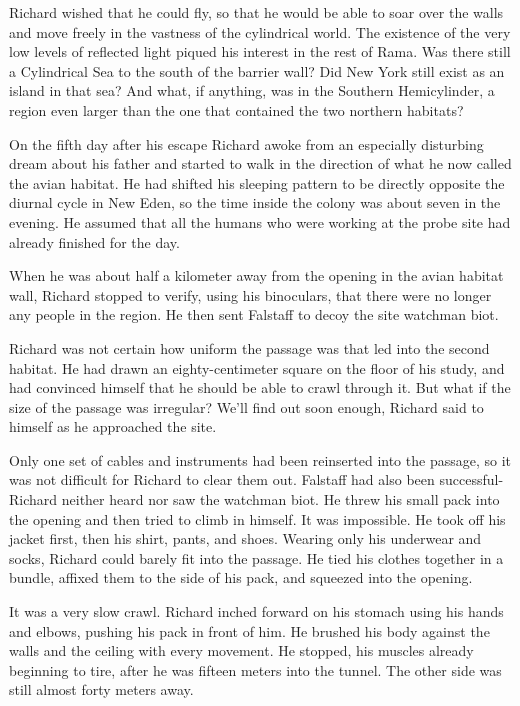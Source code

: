 \documentclass[]{article}
\begin{document}
{Richard wished that he could fly, so that he would be able to soar over the walls and move freely in the vastness of the cylindrical world.  The existence of the very low levels of reflected light piqued his interest in the rest of Rama.  Was there still a Cylindrical Sea to the south of the barrier wall? Did New York still exist as an island in that sea? And what, if anything, was in the Southern Hemicylinder, a region even larger than the one that contained the two northern habitats?

On the fifth day after his escape Richard awoke from an especially disturbing dream about his father and started to walk in the direction of what he now called the avian habitat.  He had shifted his sleeping pattern to be directly opposite the diurnal cycle in New Eden, so the time inside the colony was about seven in the evening.  He assumed that all the humans who were working at the probe site had already finished for the day.

When he was about half a kilometer away from the opening in the avian habitat wall, Richard stopped to verify, using his binoculars, that there were no longer any people in the region.  He then sent Falstaff to decoy the site watchman biot.

Richard was not certain how uniform the passage was that led into the second habitat.  He had drawn an eighty-centimeter square on the floor of his study, and had convinced himself that he should be able to crawl through it.  But what if the size of the passage was irregular? We’ll find out soon enough, Richard said to himself as he approached the site.

Only one set of cables and instruments had been reinserted into the passage, so it was not difficult for Richard to clear them out.  Falstaff had also been successful-Richard neither heard nor saw the watchman biot.  He threw his small pack into the opening and then tried to climb in himself.  It was impossible.  He took off his jacket first, then his shirt, pants, and shoes.  Wearing only his underwear and socks, Richard could barely fit into the passage.  He tied his clothes together in a bundle, affixed them to the side of his pack, and squeezed into the opening.

It was a very slow crawl.  Richard inched forward on his stomach using his hands and elbows, pushing his pack in front of him.  He brushed his body against the walls and the ceiling with every movement.  He stopped, his muscles already beginning to tire, after he was fifteen meters into the tunnel.  The other side was still almost forty meters away.

}
\end{document}
